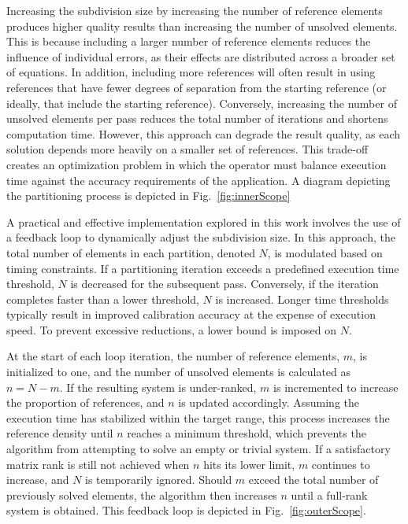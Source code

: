 \documentclass[journal]{IEEEtran}
\begin{document}
Increasing the subdivision size by increasing the number of reference elements produces higher quality results than increasing the number of unsolved elements. This is because including a larger number of reference elements reduces the influence of individual errors, as their effects are distributed across a broader set of equations. In addition, including more references will often result in using references that have fewer degrees of separation from the starting reference (or ideally, that include the starting reference). Conversely, increasing the number of unsolved elements per pass reduces the total number of iterations and shortens computation time. However, this approach can degrade the result quality, as each solution depends more heavily on a smaller set of references. This trade-off creates an optimization problem in which the operator must balance execution time against the accuracy requirements of the application. A diagram depicting the partitioning process is depicted in Fig.~\ref{fig:innerScope}

A practical and effective implementation explored in this work involves the use of a feedback loop to dynamically adjust the subdivision size. In this approach, the total number of elements in each partition, denoted $N$, is modulated based on timing constraints. If a partitioning iteration exceeds a predefined execution time threshold, $N$ is decreased for the subsequent pass. Conversely, if the iteration completes faster than a lower threshold, $N$ is increased. Longer time thresholds typically result in improved calibration accuracy at the expense of execution speed. To prevent excessive reductions, a lower bound is imposed on $N$.

At the start of each loop iteration, the number of reference elements, $m$, is initialized to one, and the number of unsolved elements is calculated as $n = N - m$. If the resulting system is under-ranked, $m$ is incremented to increase the proportion of references, and $n$ is updated accordingly. Assuming the execution time has stabilized within the target range, this process increases the reference density until $n$ reaches a minimum threshold, which prevents the algorithm from attempting to solve an empty or trivial system. If a satisfactory matrix rank is still not achieved when $n$ hits its lower limit, $m$ continues to increase, and $N$ is temporarily ignored. Should $m$ exceed the total number of previously solved elements, the algorithm then increases $n$ until a full-rank system is obtained. This feedback loop is depicted in Fig.~\ref{fig:outerScope}.
\end{document}
